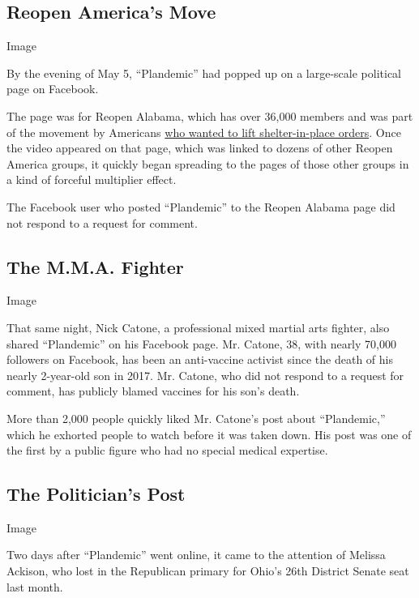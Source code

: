 \hypertarget{reopen-americas-move}{%
\subsection{Reopen America's Move}\label{reopen-americas-move}}

Image

By the evening of May 5, ``Plandemic'' had popped up on a large-scale
political page on Facebook.

The page was for Reopen Alabama, which has over 36,000 members and was
part of the movement by Americans
\href{https://www.nytimes3xbfgragh.onion/2020/04/21/us/politics/coronavirus-protests-trump.html}{who
wanted to lift shelter-in-place orders}. Once the video appeared on that
page, which was linked to dozens of other Reopen America groups, it
quickly began spreading to the pages of those other groups in a kind of
forceful multiplier effect.

The Facebook user who posted ``Plandemic'' to the Reopen Alabama page
did not respond to a request for comment.

\hypertarget{the-mma-fighter}{%
\subsection{The M.M.A. Fighter}\label{the-mma-fighter}}

Image

That same night, Nick Catone, a professional mixed martial arts fighter,
also shared ``Plandemic'' on his Facebook page. Mr. Catone, 38, with
nearly 70,000 followers on Facebook, has been an anti-vaccine activist
since the death of his nearly 2-year-old son in 2017. Mr. Catone, who
did not respond to a request for comment, has publicly blamed vaccines
for his son's death.

More than 2,000 people quickly liked Mr. Catone's post about
``Plandemic,'' which he exhorted people to watch before it was taken
down. His post was one of the first by a public figure who had no
special medical expertise.

\hypertarget{the-politicians-post}{%
\subsection{The Politician's Post}\label{the-politicians-post}}

Image

Two days after ``Plandemic'' went online, it came to the attention of
Melissa Ackison, who lost in the Republican primary for Ohio's 26th
District Senate seat last month.

